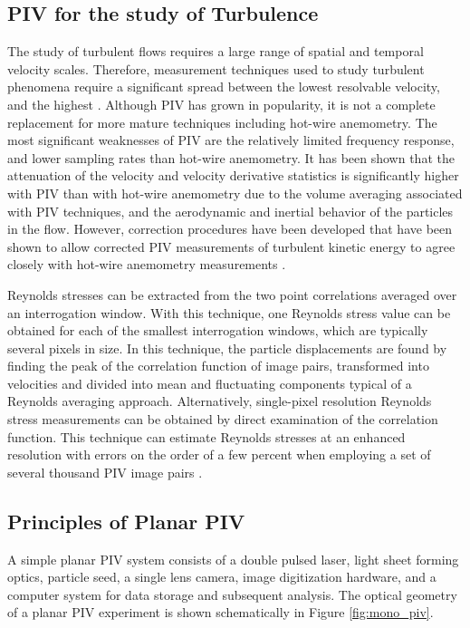 \subsection{PIV for the study of Turbulence}
The study of turbulent flows requires a large range of spatial and temporal 
velocity scales. Therefore, measurement techniques used to study turbulent 
phenomena require a significant spread between the lowest resolvable velocity, 
and the highest \cite{barnhart1994}. Although PIV has grown in popularity, it 
is not a complete replacement for more mature techniques including hot-wire 
anemometry. The most significant weaknesses of PIV are the relatively limited 
frequency response, and lower sampling rates than hot-wire anemometry.
It has been shown that the attenuation of the velocity and velocity derivative 
statistics is significantly higher with PIV than with hot-wire anemometry due 
to the volume averaging associated with PIV techniques, and the aerodynamic and 
inertial behavior of the particles in the flow.
However, correction procedures have been developed that have been shown to 
allow corrected PIV measurements of turbulent kinetic energy to agree closely 
with hot-wire anemometry measurements \cite{lavoie2007,kasagi1991}. 

Reynolds stresses can be extracted from the two point correlations averaged 
over 
an interrogation window. With this technique, one Reynolds stress value can be 
obtained for each of the smallest interrogation windows, which are typically 
several pixels in size. In this technique, the particle displacements are found 
by finding the peak of the correlation function of image pairs, transformed 
into velocities and divided into mean and fluctuating components typical 
of a Reynolds averaging approach. Alternatively, single-pixel resolution 
Reynolds stress measurements can be obtained by direct examination of the 
correlation function. This technique can estimate Reynolds stresses at an 
enhanced resolution with errors on the order of a few percent when employing a 
set of several thousand PIV image pairs \cite{scharnowski2011}.

\subsection{Principles of Planar PIV}

A simple planar PIV system consists of a double pulsed laser, light sheet 
forming optics, particle seed, a single lens camera, image digitization 
hardware, and a computer system for data storage and subsequent analysis. The 
optical geometry of a planar PIV experiment is shown schematically in Figure 
\ref{fig:mono_piv}.

